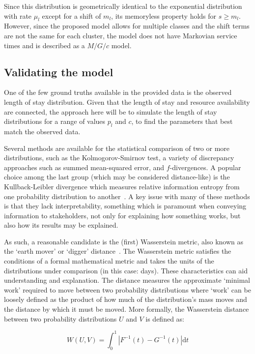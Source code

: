 \documentclass[]{interact}
\theoremstyle{plain}%
\theoremstyle{definition}
\theoremstyle{remark}
\begin{document}
Since this distribution is geometrically identical to the exponential
distribution with rate \(\mu_l\) except for a shift of \(m_l\), its memoryless
property holds for \(s \ge m_l\). However, since the proposed model allows for
multiple classes and the shift terms are not the same for each cluster, the
model does not have Markovian service times and is described as a \(M/G/c\)
model.

\subsection{Validating the model}\label{subsec:validate}

One of the few ground truths available in the provided data is the observed
length of stay distribution. Given that the length of stay and resource
availability are connected, the approach here will be to simulate the length of
stay distributions for a range of values \(p_l\) and \(c\), to find the
parameters that best match the observed data.

Several methods are available for the statistical comparison of two or more
distributions, such as the Kolmogorov-Smirnov test, a variety of discrepancy
approaches such as summed mean-squared error, and \(f\)-divergences. A popular
choice among the last group (which may be considered distance-like) is the
Kullback-Leibler divergence which measures relative information entropy from one
probability distribution to another~\citep{Kullback1951}. A key issue with many
of these methods is that they lack interpretability, something which is
paramount when conveying information to stakeholders, not only for explaining
how something works, but also how its results may be explained.

As such, a reasonable candidate is the (first) Wasserstein metric, also known as
the `earth mover' or `digger' distance~\citep{Vaserstein1969}. The Wasserstein
metric satisfies the conditions of a formal mathematical metric and takes the
units of the distributions under comparison (in this case: days). These
characteristics can aid understanding and explanation. The distance measures the
approximate `minimal work' required to move between two probability
distributions where `work' can be loosely defined as the product of how much of
the distribution's mass moves and the distance by which it must be moved. More
formally, the Wasserstein distance between two probability distributions \(U\)
and \(V\) is defined as:

\begin{equation}\label{eq:wasserstein}
    W(U, V) = {
        \int_{0}^{1} \left\vert F^{-1}(t) - G^{-1}(t) \right\vert \mathrm dt
    }
\end{equation}
\end{document}
